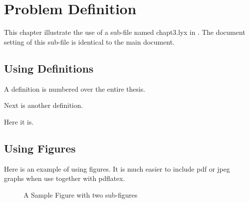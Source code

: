 \chapter{Problem Definition}

This chapter illustrate the use of a sub-file named chapt3.lyx in
\LyX{}. The document setting of this sub-file is identical to the
main document. 


\section{Using Definitions}
\begin{defn}
A definition is numbered over the entire thesis.
\end{defn}
Next is another definition.
\begin{defn}
Here it is.
\end{defn}

\section{Using Figures}

Here is an example of using figures. It is much easier to include
pdf or jpeg graphs when use \LyX{} together with pdflatex.

\begin{figure}
\noindent \begin{centering}
 
\par\end{centering}

\caption{A Sample Figure with two sub-figures}
\end{figure}

